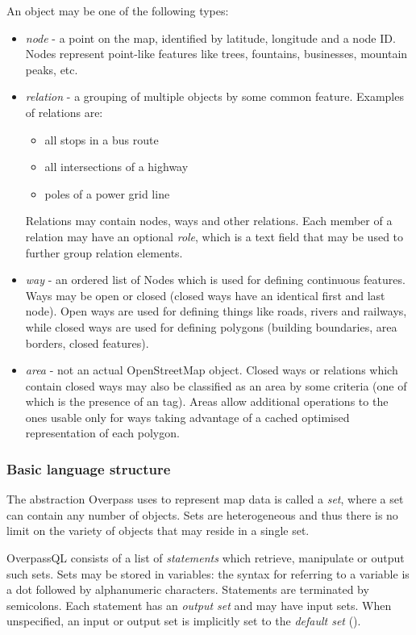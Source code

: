 \documentclass[main.tex]{subfiles}
\begin{document}
An object may be one of the following types:
\begin{itemize}
    \item \emph{node} - a point on the map, identified by latitude, longitude
        and a node ID. Nodes represent point-like features like trees, fountains,
        businesses, mountain peaks, etc.
    \item \emph{relation} - a grouping of multiple objects by some common
        feature. Examples of relations are:
        \begin{itemize}
            \item all stops in a bus route
            \item all intersections of a highway
            \item poles of a power grid line
        \end{itemize}
        Relations may contain nodes, ways and other relations. Each member of
        a relation may have an optional \emph{role}, which is a text field
        that may be used to further group relation elements.
    \item \emph{way} - an ordered list of Nodes which is used for defining
        continuous features. Ways may be open or closed (closed ways have an
        identical first and last node). Open ways are used for defining things
        like roads, rivers and railways, while closed ways are used for defining
        polygons (building boundaries, area borders, closed features).
    \item \emph{area} - not an actual OpenStreetMap object. Closed ways or relations
        which contain closed ways may also be classified as an area by some
        criteria (one of which is the presence of an  tag).
        Areas allow additional operations to the ones usable only for ways
        taking advantage of a cached optimised representation of each polygon.
\end{itemize}

\subsubsection{Basic language structure}
The abstraction Overpass uses to represent map data is called a \emph{set},
where a set can contain any number of objects. Sets are heterogeneous and thus
there is no limit on the variety of objects that may reside in a single set.

OverpassQL consists of a list of \emph{statements} which retrieve, manipulate
or output such sets. Sets may be stored in variables: the syntax for referring
to a variable is a dot followed by alphanumeric characters.
Statements are terminated by semicolons.
Each statement has an \emph{output set} and may have input sets. When unspecified,
an input or output set is implicitly set to the \emph{default set} ().
\end{document}
